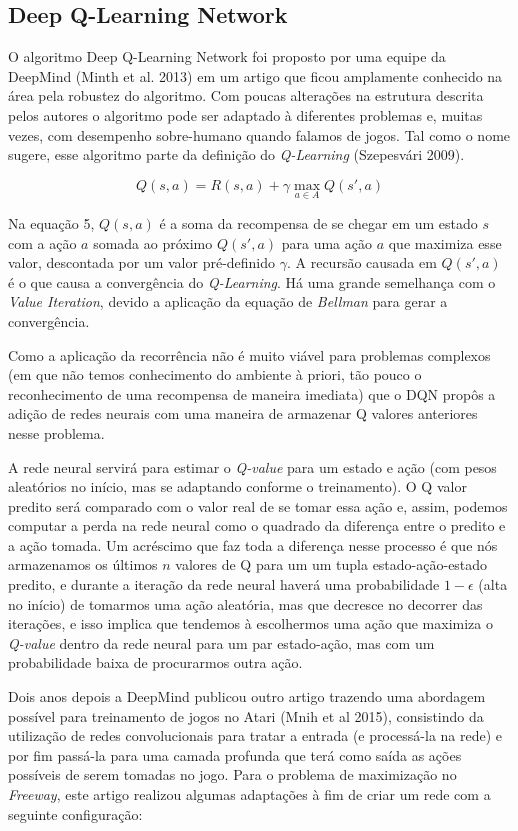 \documentclass[letterpaper]{article} %
\begin{document}
\subsection{Deep Q-Learning Network}
O algoritmo Deep Q-Learning Network foi proposto por uma equipe da DeepMind (Minth et al. 2013) em um artigo que ficou amplamente conhecido na área pela robustez do algoritmo. Com poucas alterações na estrutura descrita pelos autores o algoritmo pode ser adaptado à diferentes problemas e, muitas vezes, com desempenho sobre-humano quando falamos de jogos. Tal como o nome sugere, esse algoritmo parte da definição do \textit{Q-Learning} (Szepesvári 2009).

\begin{equation}
Q(s,a) = R(s,a) + \gamma \max_{a \in A} Q(s',a)
\end{equation}

Na equação 5, $Q(s,a)$ é a soma da recompensa de se chegar em um estado $s$ com a ação $a$ somada ao próximo $Q(s',a)$ para uma ação $a$ que maximiza esse valor, descontada por um valor pré-definido $\gamma$. A recursão causada em $Q(s',a)$ é o que causa a convergência do \textit{Q-Learning}. Há uma grande semelhança com o \textit{Value Iteration}, devido a aplicação da equação de \textit{Bellman} para gerar a convergência.

Como a aplicação da recorrência não é muito viável para problemas complexos (em que não temos conhecimento do ambiente à priori, tão pouco o reconhecimento de uma recompensa de maneira imediata) que o DQN propôs a adição de redes neurais com uma maneira de armazenar Q valores anteriores nesse problema.

A rede neural servirá para estimar o \textit{Q-value} para um estado e ação (com pesos aleatórios no início, mas se adaptando conforme o treinamento). O Q valor predito será comparado com o valor real de se tomar essa ação e, assim, podemos computar a perda na rede neural como o quadrado da diferença entre o predito e a ação tomada. Um acréscimo que faz toda a diferença nesse processo é que nós armazenamos os últimos $n$ valores de Q para um um tupla estado-ação-estado predito, e durante a iteração da rede neural haverá uma probabilidade $1-\epsilon$ (alta no início) de tomarmos uma ação aleatória, mas que decresce no decorrer das iterações, e isso implica que tendemos à escolhermos uma ação que maximiza o \textit{Q-value} dentro da rede neural para um par estado-ação, mas com um probabilidade baixa de procurarmos outra ação.

Dois anos depois a DeepMind publicou outro artigo trazendo uma abordagem possível para treinamento de jogos no Atari (Mnih et al 2015), consistindo da utilização de redes convolucionais para tratar a entrada (e processá-la na rede) e por fim passá-la para uma camada profunda que terá como saída as ações possíveis de serem tomadas no jogo. Para o problema de maximização no \textit{Freeway}, este artigo realizou algumas adaptações à fim de criar um rede com a seguinte configuração: 
\end{document}
